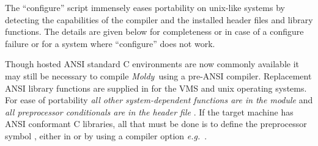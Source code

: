 \documentclass[a4paper,twoside]{report}
\newcommand{\moldy}{\emph{Moldy}}
\newcommand{\eg}{\emph{e.g.}}
\begin{document}
The ``configure'' script immensely eases portability on unix-like
systems by detecting the capabilities of the compiler and the
installed header files and library functions. The details are given
below for completeness or in case of a configure failure or for a
system where ``configure'' does not work.

Though hosted ANSI standard C environments are now commonly available
it may still be necessary to compile \moldy\ using a pre-ANSI
compiler.  Replacement ANSI library functions are supplied in
 for the VMS and unix operating systems.  For ease of
portability \emph{all other system-dependent functions are in the
  module } and \emph{all preprocessor conditionals are
  in the header file }. If the target machine has ANSI
conformant C libraries, all that must be done is to define the
preprocessor symbol , either in  or by
using a compiler option \eg\ .
\end{document}
